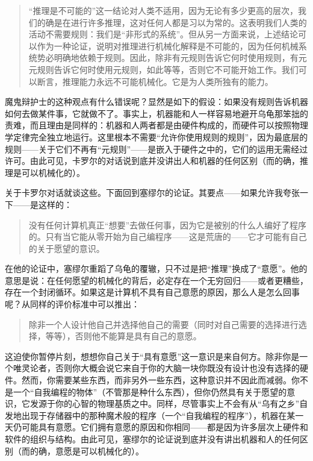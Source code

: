 \begin{quote}
“推理是不可能的”这一结论对人类不适用，因为无论有多少更高的层次，我们的确是在进行许多推理，这对任何人都是习以为常的。这表明我们人类的活动不需要规则：我们是“非形式的系统”。但从另一方面来说，上述结论可以作为一种论证，说明对推理进行机械化解释是不可能的，因为任何机械系统势必明确地依赖于规则。因此，除非有元规则告诉它何时使用规则，有元元规则告诉它何时使用元规则，如此等等，否则它不可能开始工作。我们可以断言，推理能力永远不可能机械化。它是为人类所独有的能力。
\end{quote}

魔鬼辩护士的这种观点有什么错误呢？显然是如下的假设：如果没有规则告诉机器如何去做某件事，它就做不了。事实上，机器能和人一样容易地避开乌龟那笨拙的责难，而且理由是同样的：机器和人两者都是由硬件构成的，而硬件可以按照物理学定律完全独立地运行。这里根本不需要“允许你使用规则的规则”，因为最底层的规则——关于它们不再有“元规则”——是嵌入于硬件之中的，它们的运用无需经过许可。由此可见，卡罗尔的对话说到底并没讲出人和机器的任何区别（而的确，推理是可以机械化的）。

关于卡罗尔对话就谈这些。下面回到塞缪尔的论证。其要点——如果允许我夸张一下——是这样的：

\begin{quote}
没有任何计算机真正“想要”去做任何事，因为它是被别的什么人编好了程序的。只有当它能从零开始为自己编程序——这是荒唐的——它才可能有自己的关于愿望的意识。
\end{quote}

在他的论证中，塞缪尔重蹈了乌龟的覆辙，只不过是把“推理”换成了“意愿”。他的意思是说：在任何愿望的机械化的背后，必定存在一个无穷回归——或者更糟些，存在一个封闭循环。如果这是计算机不具有自己意愿的原因，那么人是怎么回事呢？从同样的评价标准中可以推出：

\begin{quote}
除非一个人设计他自己并选择他自己的需要（同时对自己需要的选择进行选择，等等），否则他不能算是具有自己的意愿。
\end{quote}

这迫使你暂停片刻，想想你自己关于“具有意愿”这一意识是来自何方。除非你是一个唯灵论者，否则你大概会说它来自于你的大脑一块你既没有设计也没有选择的硬件。然而，你需要某些东西，而非另外一些东西，这种意识并不因此而减弱。你不是一个“自我编程的物体”（不管那是种什么东西），但你仍然具有关于愿望的意识，它发源于你的心智的物理基质之中。同样，尽管事实上不会有从“乌有之乡”自发地出现于存储器中的那种魔术般的程序（一个“自我编程的程序”），机器在某一天仍可能具有意愿。它们拥有意愿的原因和你相同——都是因为许多层次上硬件和软件的组织与结构。由此可见，塞缪尔的论证说到底并没有讲出机器和人的任何区别（而的确，意愿是可以机械化的）。

